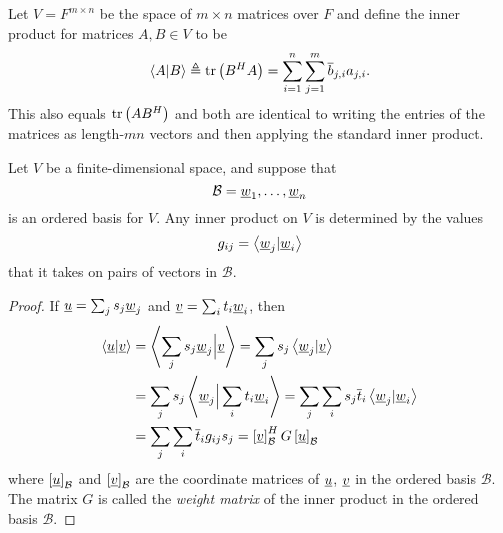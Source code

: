 \begin{example}
Let $V=F^{m\times n}$ be the space of $m\times n$ matrices over $F$ and define the inner product for matrices $A,B \in V$ to be
\begin{equation*}
\left\langle A | B \right\rangle \triangleq \mathrm{tr} \left(B^H A \right) = \sum_{i=1}^n \sum_{j=1}^m \overline{b}_{j,i} a_{j,i}.
\end{equation*}
This also equals $\mathrm{tr} \left(A B^H\right)$ and both are identical to writing the entries of the matrices as length-$mn$ vectors and then applying the standard inner product.
\end{example}

\begin{theorem}
Let $V$ be a finite-dimensional space, and suppose that
\begin{equation*}
\mathcal{B} = \underline{w}_1, \ldots, \underline{w}_n
\end{equation*}
is an ordered basis for $V$.
Any inner product on $V$ is determined by the values
\begin{equation*}
g_{ij} = \left\langle \underline{w}_j | \underline{w}_i \right\rangle
\end{equation*}
that it takes on pairs of vectors in $\mathcal{B}$.
\end{theorem}
\begin{proof}
If $\underline{u} = \sum_{j} s_j \underline{w}_j$ and $\underline{v} = \sum_{i} t_i \underline{w}_i$, then
\begin{equation*}
\begin{split}
\left\langle \underline{u} | \underline{v} \right\rangle
&= \left\langle \sum_{j} s_j \underline{w}_j \Big| \underline{v} \right\rangle
= \sum_{j} s_j \left\langle \underline{w}_j | \underline{v} \right\rangle \\
&= \sum_{j} s_j \left\langle \underline{w}_j \Big| \sum_{i} t_i \underline{w}_i \right\rangle
= \sum_{j} \sum_{i} s_j \overline{t}_i \left\langle \underline{w}_j | \underline{w}_i \right\rangle \\
&= \sum_{j} \sum_{i} \overline{t}_i g_{ij} s_j
= \left[ \underline{v} \right]_{\mathcal{B}}^H G \left[ \underline{u} \right]_{\mathcal{B}}
\end{split}
\end{equation*}
where $\left[ \underline{u} \right]_{\mathcal{B}}$ and $\left[ \underline{v} \right]_{\mathcal{B}}$ are the coordinate matrices of $\underline{u}$, $\underline{v}$ in the ordered basis $\mathcal{B}$.
The matrix $G$ is called the \emph{weight matrix} of the inner product in the ordered basis $\mathcal{B}$.
\end{proof}

